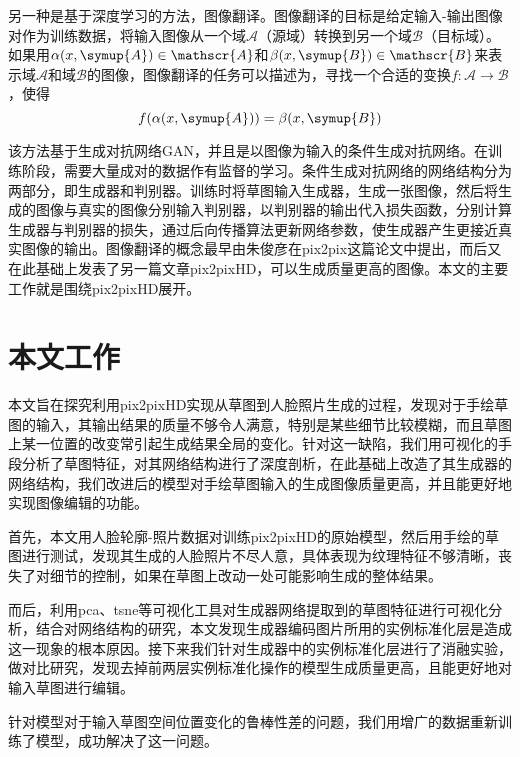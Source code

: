 另一种是基于深度学习的方法，图像翻译\cite{pix2pix}。图像翻译的目标是给定输入-输出图像对作为训练数据，将输入图像从一个域$\mathscr{A}$（源域）转换到另一个域$\mathscr{B}$（目标域）。如果用$\alpha (x, \symup{A}) \in \mathscr{A}$和$\beta(x,\symup{B})\in\mathscr{B}$来表示域$\mathscr{A}$和域$\mathscr{B}$的图像，图像翻译的任务可以描述为，寻找一个合适的变换$f:\mathscr{A}\to\mathscr{B}$，使得
\begin{equation}
  f(\alpha (x, \symup{A})) = \beta(x,\symup{B})
\end{equation}

该方法基于生成对抗网络GAN\cite{gan}，并且是以图像为输入的条件生成对抗网络\cite{cgan}。在训练阶段，需要大量成对的数据作有监督的学习。条件生成对抗网络的网络结构分为两部分，即生成器和判别器。训练时将草图输入生成器，生成一张图像，然后将生成的图像与真实的图像分别输入判别器，以判别器的输出代入损失函数，分别计算生成器与判别器的损失，通过后向传播算法更新网络参数，使生成器产生更接近真实图像的输出。图像翻译的概念最早由朱俊彦在pix2pix\cite{pix2pix}这篇论文中提出，而后又在此基础上发表了另一篇文章pix2pixHD\cite{pix2pixhd}，可以生成质量更高的图像。本文的主要工作就是围绕pix2pixHD展开。

\section{本文工作}

本文旨在探究利用pix2pixHD实现从草图到人脸照片生成的过程，发现对于手绘草图的输入，其输出结果的质量不够令人满意，特别是某些细节比较模糊，而且草图上某一位置的改变常引起生成结果全局的变化。针对这一缺陷，我们用可视化的手段分析了草图特征，对其网络结构进行了深度剖析，在此基础上改造了其生成器的网络结构，我们改进后的模型对手绘草图输入的生成图像质量更高，并且能更好地实现图像编辑的功能。

首先，本文用人脸轮廓-照片数据对训练pix2pixHD的原始模型，然后用手绘的草图进行测试，发现其生成的人脸照片不尽人意，具体表现为纹理特征不够清晰，丧失了对细节的控制，如果在草图上改动一处可能影响生成的整体结果。

而后，利用pca、tsne等可视化工具对生成器网络提取到的草图特征进行可视化分析，结合对网络结构的研究，本文发现生成器编码图片所用的实例标准化层是造成这一现象的根本原因。接下来我们针对生成器中的实例标准化层进行了消融实验，做对比研究，发现去掉前两层实例标准化操作的模型生成质量更高，且能更好地对输入草图进行编辑。

针对模型对于输入草图空间位置变化的鲁棒性差的问题，我们用增广的数据重新训练了模型，成功解决了这一问题。

%
